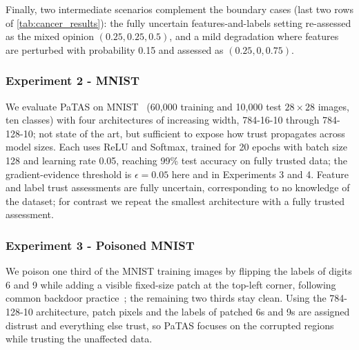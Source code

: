 Finally, two intermediate scenarios complement the boundary cases (last two rows of \cref{tab:cancer_results}): the fully uncertain features-and-labels setting re-assessed as the mixed opinion \((0.25,0.25,0.5)\), and a mild degradation where features are perturbed with probability 0.15 and assessed as \((0.25,0,0.75)\).

\subsubsection{Experiment 2 - MNIST}\label{exp:2}

We evaluate PaTAS on MNIST~\cite{lecun1998mnist} (60{,}000 training and 10{,}000 test \(28\times28\) images, ten classes) with four architectures of increasing width, 784-16-10 through 784-128-10; not state of the art, but sufficient to expose how trust propagates across model sizes. Each uses ReLU and Softmax, trained for 20 epochs with batch size 128 and learning rate 0.05, reaching 99\% test accuracy on fully trusted data; the gradient-evidence threshold is $\epsilon = 0.05$ here and in Experiments 3 and 4. Feature and label trust assessments are fully uncertain, corresponding to no knowledge of the dataset; for contrast we repeat the smallest architecture with a fully trusted assessment.

\subsubsection{Experiment 3 - Poisoned MNIST}\label{exp:3}
We poison one third of the MNIST training images by flipping the labels of digits 6 and 9 while adding a visible fixed-size patch at the top-left corner, following common backdoor practice~\cite{chen2017targetedbackdoorattacksdeep}; the remaining two thirds stay clean. Using the 784-128-10 architecture, patch pixels and the labels of patched 6s and 9s are assigned distrust and everything else trust, so PaTAS focuses on the corrupted regions while trusting the unaffected data.


